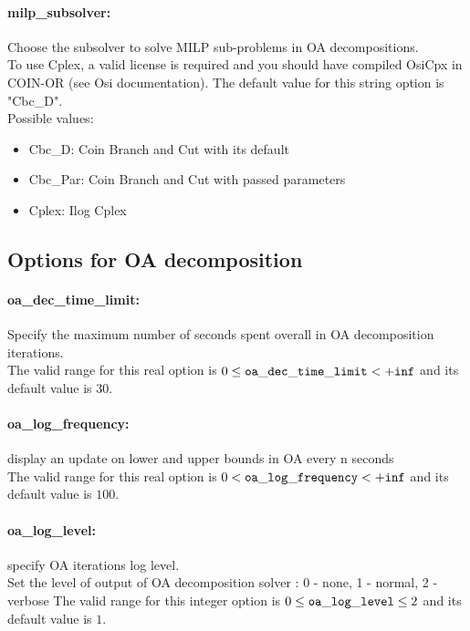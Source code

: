\paragraph{milp\_subsolver:} Choose the subsolver to solve MILP sub-problems in OA decompositions. $\;$ \\
  To use Cplex, a valid license is required and
you should have compiled OsiCpx in COIN-OR  (see
Osi documentation).
The default value for this string option is "Cbc\_D".
\\ 
Possible values:
\begin{itemize}
   \item Cbc\_D: Coin Branch and Cut with its default
   \item Cbc\_Par: Coin Branch and Cut with passed parameters
   \item Cplex: Ilog Cplex
\end{itemize}

\subsection{Options for OA decomposition}
\label{sec:Options_for_OA_decomposition}
\paragraph{oa\_dec\_time\_limit:} Specify the maximum number of seconds spent overall in OA decomposition iterations. $\;$ \\
 The valid range for this real option is 
$0 \le {\tt oa\_dec\_time\_limit } <  {\tt +inf}$
and its default value is $30$.


\paragraph{oa\_log\_frequency:} display an update on lower and upper bounds in OA every n seconds $\;$ \\
 The valid range for this real option is 
$0 <  {\tt oa\_log\_frequency } <  {\tt +inf}$
and its default value is $100$.


\paragraph{oa\_log\_level:} specify OA iterations log level. $\;$ \\
 Set the level of output of OA decomposition
solver : 0 - none, 1 - normal, 2 - verbose The valid range for this integer option is
$0 \le {\tt oa\_log\_level } \le 2$
and its default value is $1$.


